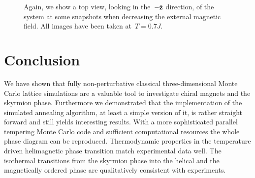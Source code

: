 \begin{figure}[H]
  \centering
  \caption{Again, we show a top view, \ie{} looking in the~$-\hat{\mathbf{z}}$ direction, of
  the system at some snapshots when decreasing the external magnetic field. All
  images have been taken at~$T= 0.7 J$.}
\label{fig:kill}
\end{figure}

%
\section{Conclusion}\label{sec:conclusion}
%
We have shown that fully non-perturbative classical three-dimensional Monte
Carlo lattice simulations are a valuable tool to investigate chiral magnets and
the skyrmion phase. Furthermore we demonstrated that the implementation of the
simulated annealing algorithm, at least a simple version of it, is rather
straight forward and still yields interesting results. With a more sophisticated
parallel tempering Monte Carlo code and sufficient computational resources the
whole phase diagram can be reproduced. Thermodynamic properties in the
temperature driven helimagnetic phase transition match experimental data well.
The isothermal transitions from the skyrmion phase into the helical and the
magnetically ordered phase are qualitatively consistent with experiments.
